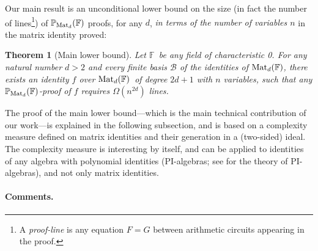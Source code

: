 \documentclass[12pt,reqno]{article}
\newtheorem{theorem}{Theorem}
\newcommand\F{\ensuremath{\mathbb F}}
\newcommand\PP{{\mathbb P}}
\newcommand\PMd{\ensuremath{\PP_{{\rm Mat}_d}(\F)}}
\newcommand\PMtwo{\ensuremath{\PP_{{\rm Mat}_2}(\F)}}
\newcommand {\para}[1] {\paragraph{#1}}
\newcommand{\matd}{{\ensuremath{{\rm Mat}_d(\F)}}}
\begin{document}
%
%
%
%


Our main result is an unconditional lower bound on the size (in fact the number of lines\footnote{A \textit{proof-line} is any equation $F=G$   between arithmetic circuits appearing in the proof.}) of $\PP_{{\rm Mat}_d}(\F) $ proofs, for any $d$, \textit{in terms of the number of variables $n$} in the matrix identity proved:

\begin{theorem}[Main lower bound]
\label{thm:main_lb_on_matrix_proofs}
Let \F\ be any field of characteristic 0.
For any natural number $d>2$ and  every finite basis \(\mathcal B\) of the  identities of \matd, there exists an identity \(f\) over \matd\ of degree $2d+1$ with $n$ variables, such that any \PMd-proof of $f$ requires $\Omega(n^{2d})$ lines.
\end{theorem}

The proof of the main lower bound---which is the main technical contribution of our work---is explained in the following subsection, and is based on a complexity measure defined on matrix identities and their generation in a (two-sided) ideal. The complexity measure is interesting by itself, and can be applied to identities of any algebra with polynomial identities (PI-algebras; see \cite{Row80,Dre99} for the theory of PI-algebras), and not only matrix identities.

\para{Comments.}
\end{document}
